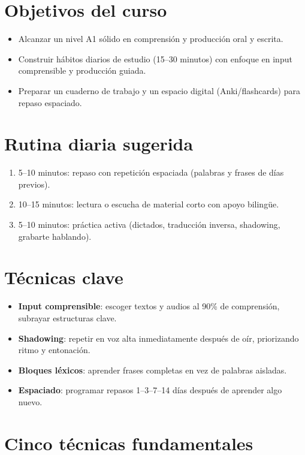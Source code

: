 \section*{Objetivos del curso}
\begin{itemize}[leftmargin=*]
	\item Alcanzar un nivel A1 sólido en comprensión y producción oral y escrita.
	\item Construir hábitos diarios de estudio (15--30 minutos) con enfoque en input comprensible y producción guiada.
	\item Preparar un cuaderno de trabajo y un espacio digital (Anki/flashcards) para repaso espaciado.
\end{itemize}

\section*{Rutina diaria sugerida}
\begin{enumerate}[leftmargin=*]
	\item 5--10 minutos: repaso con repetición espaciada (palabras y frases de días previos).
	\item 10--15 minutos: lectura o escucha de material corto con apoyo bilingüe.
	\item 5--10 minutos: práctica activa (dictados, traducción inversa, shadowing, grabarte hablando).
\end{enumerate}

\section*{Técnicas clave}
\begin{itemize}[leftmargin=*]
	\item \textbf{Input comprensible}: escoger textos y audios al 90\% de comprensión, subrayar estructuras clave.
	\item \textbf{Shadowing}: repetir en voz alta inmediatamente después de oír, priorizando ritmo y entonación.
	\item \textbf{Bloques léxicos}: aprender frases completas en vez de palabras aisladas.
	\item \textbf{Espaciado}: programar repasos 1--3--7--14 días después de aprender algo nuevo.
\end{itemize}

\section*{Cinco técnicas fundamentales}


